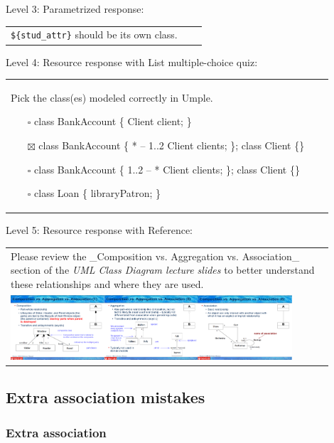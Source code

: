 \noindent Level 3: Parametrized response: \medskip

\begin{tabular}{|p{0.9\linewidth}}
\verb|${stud_attr}| should be its own class.
\end{tabular} \medskip

\noindent Level 4: Resource response with List multiple-choice quiz: \medskip

\begin{tabular}{|p{0.9\linewidth}}

Pick the class(es) modeled correctly in Umple.

\begin{itemize}
    \item[$\square$] class BankAccount \{ Client client; \}
    \item[$\boxtimes$] class BankAccount \{ * -- 1..2 Client clients; \}; class Client \{\}
    \item[$\square$] class BankAccount \{ 1..2 -- * Client clients; \}; class Client \{\}
    \item[$\square$] class Loan \{ libraryPatron; \}
\end{itemize}

\end{tabular} \medskip

\noindent Level 5: Resource response with Reference: \medskip

\begin{tabular}{|p{0.9\linewidth}}
Please review the _Composition vs. Aggregation vs. Association_ section of 
the \textit{UML Class Diagram lecture slides} to 
better understand these relationships and where they are used.

\\
\includegraphics[width=0.9\textwidth]{images/composition_aggregation_association.png}
\end{tabular} \medskip


\subsection{Extra association mistakes}

\subsubsection{Extra association}

